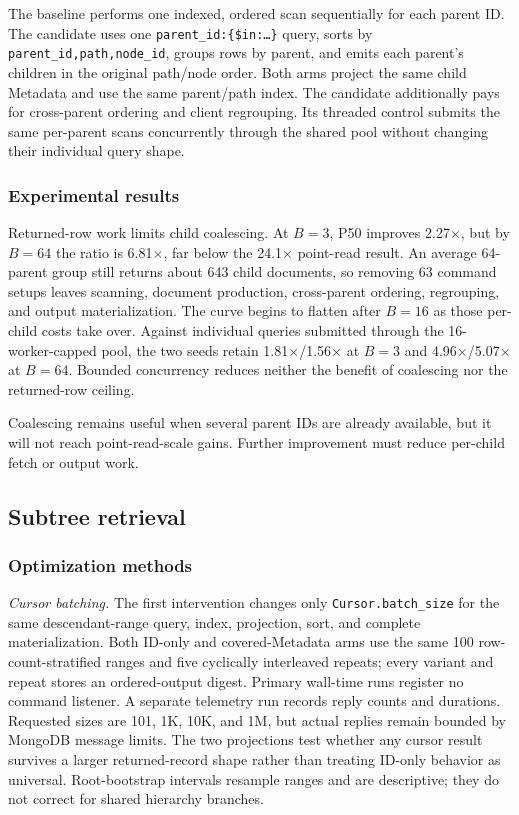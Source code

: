 \documentclass[10pt]{article}
\newcommand{\code}[1]{\texttt{#1}}
\begin{document}
The baseline performs one indexed, ordered scan sequentially for each parent
ID. The candidate uses one \code{parent\_id:\{\$in:\ldots\}} query, sorts by
\code{parent\_id,path,node\_id}, groups rows by parent, and emits each parent's
children in the original path/node order. Both arms project the same child
Metadata and use the same parent/path index. The candidate additionally pays
for cross-parent ordering and client regrouping. Its threaded control submits
the same per-parent scans concurrently through the shared pool without changing
their individual query shape.

\subsubsection{Experimental results}

Returned-row work limits child coalescing. At $B=3$, P50 improves
2.27$\times$, but by $B=64$ the ratio is 6.81$\times$, far below the
24.1$\times$ point-read result. An average 64-parent group still returns about 643
child documents, so removing 63 command setups leaves scanning, document
production, cross-parent ordering, regrouping, and output materialization.
The curve begins to flatten after $B=16$ as those per-child costs take over.
Against individual queries submitted
through the 16-worker-capped pool, the two seeds retain
1.81$\times$/1.56$\times$ at $B=3$ and
4.96$\times$/5.07$\times$ at $B=64$. Bounded concurrency reduces neither the
benefit of coalescing nor the returned-row ceiling.

Coalescing remains useful when several parent IDs are already available, but it
will not reach point-read-scale gains. Further improvement must reduce
per-child fetch or output work.

\subsection{Subtree retrieval}\label{sec:opt-subtree}

\subsubsection{Optimization methods}

\textit{Cursor batching.} The first intervention changes only
\code{Cursor.batch\_size} for the same descendant-range query, index,
projection, sort, and complete materialization. Both ID-only and
covered-Metadata arms use the same 100 row-count-stratified ranges and five
cyclically interleaved repeats; every variant and repeat stores an
ordered-output digest. Primary wall-time runs register no command listener.
A separate telemetry run records reply counts and durations. Requested sizes
are 101, 1K, 10K, and 1M, but actual replies remain bounded by MongoDB message
limits. The two projections test whether any cursor result survives a larger
returned-record shape rather than treating ID-only behavior as universal.
Root-bootstrap intervals resample ranges and are descriptive; they do not
correct for shared hierarchy branches.
\end{document}
